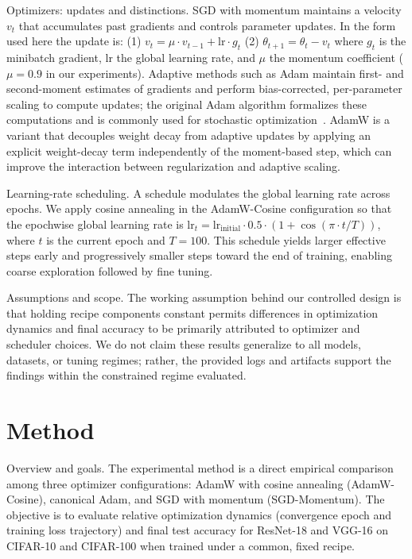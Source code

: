 \documentclass[journal,article,submit,pdftex,moreauthors]{Definitions/mdpi}
\begin{document}
Optimizers: updates and distinctions. SGD with momentum maintains a velocity $v_t$ that accumulates past gradients and controls parameter updates. In the form used here the update is:
(1) $v_t = \mu \cdot v_{t-1} + \mathrm{lr} \cdot g_t$
(2) $\theta_{t+1} = \theta_t - v_t$
where $g_t$ is the minibatch gradient, $\mathrm{lr}$ the global learning rate, and $\mu$ the momentum coefficient ($\mu = 0.9$ in our experiments). Adaptive methods such as Adam maintain first- and second-moment estimates of gradients and perform bias-corrected, per-parameter scaling to compute updates; the original Adam algorithm formalizes these computations and is commonly used for stochastic optimization~\cite{kingma-2014-adam}. AdamW is a variant that decouples weight decay from adaptive updates by applying an explicit weight-decay term independently of the moment-based step, which can improve the interaction between regularization and adaptive scaling.

Learning-rate scheduling. A schedule modulates the global learning rate across epochs. We apply cosine annealing in the AdamW-Cosine configuration so that the epochwise global learning rate is $\mathrm{lr}_t = \mathrm{lr}_{\mathrm{initial}} \cdot 0.5 \cdot (1 + \cos(\pi \cdot t / T))$, where $t$ is the current epoch and $T = 100$. This schedule yields larger effective steps early and progressively smaller steps toward the end of training, enabling coarse exploration followed by fine tuning.

Assumptions and scope. The working assumption behind our controlled design is that holding recipe components constant permits differences in optimization dynamics and final accuracy to be primarily attributed to optimizer and scheduler choices. We do not claim these results generalize to all models, datasets, or tuning regimes; rather, the provided logs and artifacts support the findings within the constrained regime evaluated.

\section{Method}

Overview and goals. The experimental method is a direct empirical comparison among three optimizer configurations: AdamW with cosine annealing (AdamW-Cosine), canonical Adam, and SGD with momentum (SGD-Momentum). The objective is to evaluate relative optimization dynamics (convergence epoch and training loss trajectory) and final test accuracy for ResNet-18 and VGG-16 on CIFAR-10 and CIFAR-100 when trained under a common, fixed recipe.
\end{document}
